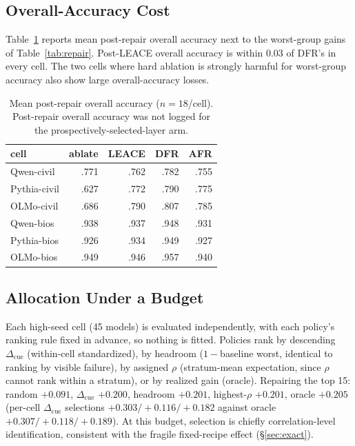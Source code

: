 \documentclass[11pt]{article}
\newcommand{\cued}{\ensuremath{\Delta_{\mathrm{cue}}}}
\begin{document}
\subsection{Overall-Accuracy Cost}
\label{app:repaircost}
Table~\ref{tab:repaircost} reports mean post-repair overall accuracy next to
the worst-group gains of Table~\ref{tab:repair}. Post-LEACE overall accuracy
is within $0.03$ of DFR's in every cell. The two cells where hard ablation is strongly harmful for worst-group
accuracy also show large overall-accuracy losses.

\begin{table}[t]
\centering\small
\setlength{\tabcolsep}{4.2pt}
\begin{tabular}{lrrrr}
\toprule
cell & ablate & LEACE & DFR & AFR \\
\midrule
Qwen-civil   & .771 & .762 & .782 & .755 \\
Pythia-civil & .627 & .772 & .790 & .775 \\
OLMo-civil   & .686 & .790 & .807 & .785 \\
Qwen-bios    & .938 & .937 & .948 & .931 \\
Pythia-bios  & .926 & .934 & .949 & .927 \\
OLMo-bios    & .949 & .946 & .957 & .940 \\
\bottomrule
\end{tabular}
\caption{Mean post-repair overall accuracy ($n{=}18$/cell). Post-repair
overall accuracy was not logged for the prospectively-selected-layer arm.}
\label{tab:repaircost}
\end{table}

\subsection{Allocation Under a Budget}
\label{app:alloc}
Each high-seed cell (45 models) is evaluated independently, with each
policy's ranking rule fixed in advance, so nothing is fitted. Policies rank
by descending \cued{} (within-cell standardized), by headroom ($1-$baseline
worst, identical to ranking by visible failure), by assigned $\rho$
(stratum-mean expectation, since $\rho$ cannot rank within a stratum), or by
realized gain (oracle). Repairing the top 15: random $+0.091$, \cued{}
$+0.200$, headroom $+0.201$, highest-$\rho$ $+0.201$, oracle $+0.205$
(per-cell \cued{} selections $+0.303/+0.116/+0.182$ against oracle
$+0.307/+0.118/+0.189$). At this budget, selection is chiefly correlation-level identification, consistent with the fragile fixed-recipe effect
(\S\ref{sec:exact}).
\end{document}
